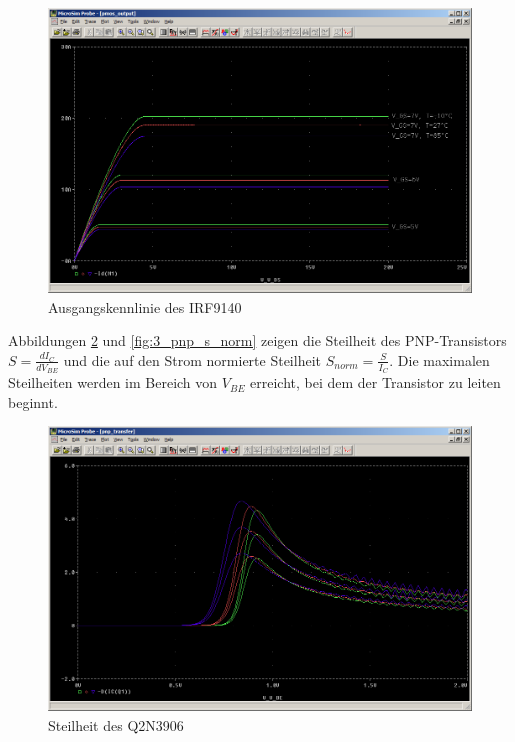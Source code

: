 \begin{figure}%
	\centering
	\includegraphics[width=\textwidth]{fig/ue2_ex3_pmos_output.PNG}
	\caption{Ausgangskennlinie des IRF9140}
	\label{fig:3_pmos_output}
\end{figure}


Abbildungen \ref{fig:3_pnp_s} und \ref{fig:3_pnp_s_norm} zeigen die Steilheit des PNP-Transistors $S = \frac{dI_C}{dV_{BE}}$ und die auf den Strom normierte Steilheit $S_{norm} = \frac{S}{I_C}$. Die maximalen Steilheiten werden im Bereich von $V_{BE}$ erreicht, bei dem der Transistor zu leiten beginnt.

\begin{figure}%
	\centering
	\includegraphics[width=\textwidth]{fig/ue2_ex3_pnp_s.PNG}
	\caption{Steilheit des Q2N3906}
	\label{fig:3_pnp_s}
\end{figure}

